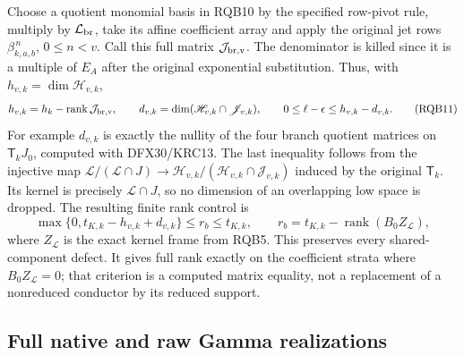 \documentclass[11pt,a4paper]{article}
\begin{document}
Choose a quotient monomial basis in RQB10 by the specified row-pivot
rule, multiply by $\mathcal L_{\rm br}$, take its affine coefficient
array and apply the original jet rows
$\beta_{k,a,b}^{\,n}$, $0\le n<v$. Call this full matrix
$\mathcal J_{\rm br,v}$. The denominator is killed since it is a
multiple of $E_A$ after the original exponential substitution.
Thus, with $h_{v,k}=\dim\mathscr H_{v,k}$,
\[
 h_{v,k}=h_k-\operatorname{rank}\mathcal J_{\rm br,v},\qquad
 d_{v,k}=\dim(\mathscr H_{v,k}\cap\mathscr J_{v,k}),\qquad
 0\le\ell-\epsilon\le h_{v,k}-d_{v,k}.
 \tag{RQB11}
\]
For example $d_{v,k}$ is exactly the nullity of the four branch
quotient matrices on $\mathsf T_kJ_0$, computed with DFX30/KRC13.
The last inequality follows from the injective map
$\mathscr L/(\mathscr L\cap J)\to
\mathscr H_{v,k}/(\mathscr H_{v,k}\cap\mathscr J_{v,k})$
induced by the original $\mathsf T_k$. Its kernel is precisely
$\mathscr L\cap J$, so no dimension of an overlapping low space
is dropped. The resulting finite rank control is
\[
 \max\{0,t_{K,k}-h_{v,k}+d_{v,k}\}
       \le r_b\le t_{K,k},\qquad
 r_b=t_{K,k}-\operatorname{rank}(B_0Z_{\mathscr L}),
 \tag{RQB12}
\]
where $Z_{\mathscr L}$ is the exact kernel frame from RQB5.
This preserves every shared-component defect. It gives full rank
exactly on the coefficient strata where $B_0Z_{\mathscr L}=0$;
that criterion is a computed matrix equality, not a replacement
of a nonreduced conductor by its reduced support.

\subsection{Full native and raw Gamma realizations}
\end{document}
